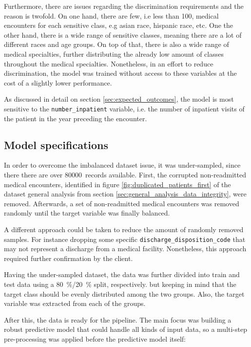 \documentclass[a4paper,11pt]{article}
\newcommand{\dischargeDispositionCode}{\texttt{discharge\_disposition\_code}\xspace}
\newcommand{\numberInpatient}{\texttt{number\_inpatient}\xspace}
\begin{document}
Furthermore, there are issues regarding the discrimination requirements and the reason is twofold. On one hand, there are few, i.e less than \SI{100}{}, medical encounters for each sensitive class, e.g asian race, hispanic race, etc. One the other hand, there is a wide range of sensitive classes, meaning there are a lot of different races and age groups. On top of that, there is also a wide range of medical specialties, further distributing the already low amount of classes throughout the medical specialties. 
Nonetheless, in an effort to reduce discrimination, the model was trained without access to these variables at the cost of a slightly lower performance.

As discussed in detail on section \ref{sec:expected_outcomes}, the model is most sensitive to the \numberInpatient variable, i.e. the number of inpatient visits of the patient in the year preceding the encounter.


\subsection{Model specifications}

In order to overcome the imbalanced dataset issue, it was under-sampled, since there there are over \SI{80000}{records} available. First, the corrupted non-readmitted medical encounters, identified in figure \ref{fig:duplicated_patients_first} of the dataset general analysis from section \ref{sec:general_analysis_data_integrity}, were removed.
Afterwards, a set of non-readmitted medical encounters was removed randomly until the target variable was finally balanced.

A different approach could be taken to reduce the amount of randomly removed samples. For instance dropping some specific \dischargeDispositionCode that may not represent a discharge from a medical facility. Nonetheless, this approach required further confirmation by the client.

Having the under-sampled dataset, the data was further divided into train and test data using a \SI{80}{\percent}/\SI{20}{\percent} split, respectively. but keeping in mind that the target class should be evenly distributed among the two groups. Also, the target variable was extracted from each of the groups.

After this, the data is ready for the pipeline. The main focus was building a robust predictive model that could handle all kinds of input data, so a multi-step pre-processing was applied before the predictive model itself:
\end{document}
